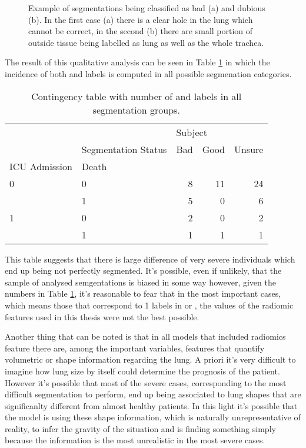 \begin{figure}[H]
\centering
	\newline
        \caption{Example of segmentations being classified as bad (a) and dubious (b). In the first case (a) there is a clear hole in the lung which cannot be correct, in the second (b) there are small portion of outside tissue being labelled as lung as well as the whole trachea.}\label{fig:ExampleSeg}
\end{figure}

The result of this qualitative analysis can be seen in Table \ref{tab:ContingencyTableSegm} in which the incidence of both \death and \icu labels is computed in all possible segmenation categories.

\begin{table}
\centering
\caption{Contingency table with number of \death and \icu labels in all segmentation groups. \label{tab:ContingencyTableSegm}}
\begin{tabular}{llrrr}
\toprule
  & {} & \multicolumn{3}{l}{Subject} \\
  & Segmentation Status &     Bad & Good & Unsure \\
ICU Admission & Death &         &      &        \\
\midrule
0 & 0 &       8 &   11 &     24 \\
  & 1 &       5 &    0 &      6 \\
1 & 0 &       2 &    0 &      2 \\
  & 1 &       1 &    1 &      1 \\
\bottomrule
\end{tabular}
\end{table}

This table suggests that there is large difference of very severe individuals which end up being not perfectly segmented.
It's possible, even if unlikely, that the sample of analysed semgentations is biased in some way however, given the numbers in Table \ref{tab:ContingencyTableSegm}, it's reasonable to fear that in the most important cases, which means those that correspond to 1 labels in \death or \icu, the values of the radiomic features used in this thesis were not the best possible. 

Another thing that can be noted is that in all models that included radiomics feature there are, among the important variables, features that quantify volumetric or shape information regarding the lung.
A priori it's very difficult to imagine how lung size by itself could determine the prognosis of the patient.
However it's possible that most of the severe cases, corresponding to the most difficult segmentation to perform, end up being associated to lung shapes that are significanlty different from almost healthy patients.
In this light it's possible that the model is using these shape information, which is naturally unrepresentative of reality, to infer the gravity of the situation and is finding something simply because the information is the most unrealistic in the most severe cases.
